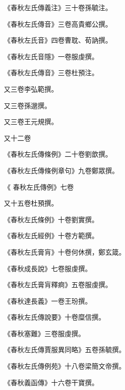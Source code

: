 \begin{pinyinscope}
 《春秋左氏傳義注》三十卷孫毓注。



 《春秋左氏傳音》三卷高貴鄉公撰。



 《春秋左氏音》四卷曹耽、荀訥撰。



 《春秋左氏音隱》一卷服虔撰。



 《春秋左氏傳音》三卷杜預注。



 又三卷李弘範撰。



 又三卷孫邈撰。



 又三卷王元規撰。



 又十二卷



 《春秋左氏傳條例》二十卷劉歆撰。



 《春秋左氏傳條例章句》九卷鄭眾撰。



 《
 春秋左氏傳例》七卷



 又十五卷杜預撰。



 《春秋左氏條例》十卷劉實撰。



 《春秋左氏經例》十卷方範撰。



 《春秋左氏膏肓》十卷何休撰，鄭玄箴。



 《春秋成長說》七卷服虔撰。



 《春秋左氏膏肓釋痾》五卷服虔撰。



 《春秋達長義》一卷王玢撰。



 《春秋左氏傳說要》十卷糜信撰。



 《春秋塞難》三卷服虔撰。



 《春秋左氏傳賈服異同略》五卷孫毓撰。



 《春秋左氏傳例苑》十八卷梁簡文帝撰。



 《春秋義函傳》十六卷干寶撰。




\end{pinyinscope}
